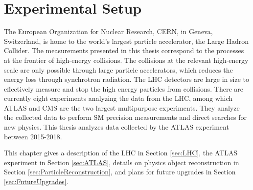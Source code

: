 \part{\LARGE{Experimental Setup}}
\label{sec:Experiment}

The European Organization for Nuclear Research, CERN, in Geneva, Switzerland, is home to the world's largest particle accelerator, the Large Hadron Collider. The measurements presented in this thesis correspond to the processes at the frontier of high-energy collisions. The collisions at the relevant high-energy scale are only possible through large particle accelerators, which reduces the energy loss through synchrotron radiation. The LHC detectors are large in size to effectively measure and stop the high energy particles from collisions. There are currently eight experiments analyzing the data from the LHC, among which ATLAS and CMS are the two largest multipurpose experiments. They analyze the collected data to perform SM precision measurements and direct searches for new physics. This thesis analyzes data collected by the ATLAS experiment between 2015-2018.

This chapter gives a description of the LHC in Section \ref{sec:LHC}, the ATLAS experiment in Section \ref{sec:ATLAS}, details on physics object reconstruction in Section \ref{sec:ParticleReconstruction}, and plans for future upgrades in Section \ref{sec:FutureUpgrades}. 